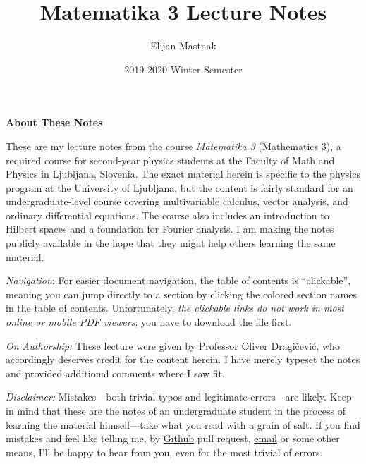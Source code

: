 \documentclass[11pt, a4paper]{article}
\begin{document}
\title{Matematika 3 Lecture Notes}
\author{Elijan Mastnak}
\date{2019-2020 Winter Semester}
\maketitle


\begin{center}
\textbf{About These Notes}
\end{center}
These are my lecture notes from the course \textit{Matematika 3} (Mathematics 3), a required course for second-year physics students at the Faculty of Math and Physics in Ljubljana, Slovenia. The exact material herein is specific to the physics program at the University of Ljubljana, but the content is fairly standard for an undergraduate-level course covering multivariable calculus, vector analysis, and ordinary differential equations. The course also includes an introduction to Hilbert spaces and a foundation for Fourier analysis. I am making the notes publicly available in the hope that they might help others learning the same material.

\vspace{2mm}
\textit{Navigation}: For easier document navigation, the table of contents is ``clickable'', meaning you can jump directly to a section by clicking the colored section names in the table of contents. Unfortunately, \textit{the clickable links do not work in most online or mobile PDF viewers}; you have to download the file first.


\vspace{2mm}
\textit{On Authorship:} These lecture were given by Professor Oliver Dragi\v{c}evi\'{c}, who accordingly deserves credit for the content herein. I have merely typeset the notes and provided additional comments where I saw fit.

\vspace{2mm}
\textit{Disclaimer:} Mistakes---both trivial typos and legitimate errors---are likely. Keep in mind that these are the notes of an undergraduate student in the process of learning the material himself---take what you read with a grain of salt. If you find mistakes and feel like telling me, by \href{https://github.com/ejmastnak/fmf}{\underline{Github}} pull request, \href{mailto:ejmastnak@gmail.com}{\underline{email}} or some other means, I'll be happy to hear from you, even for the most trivial of errors.

 \newpage

\tableofcontents

\newpage
\end{document}
